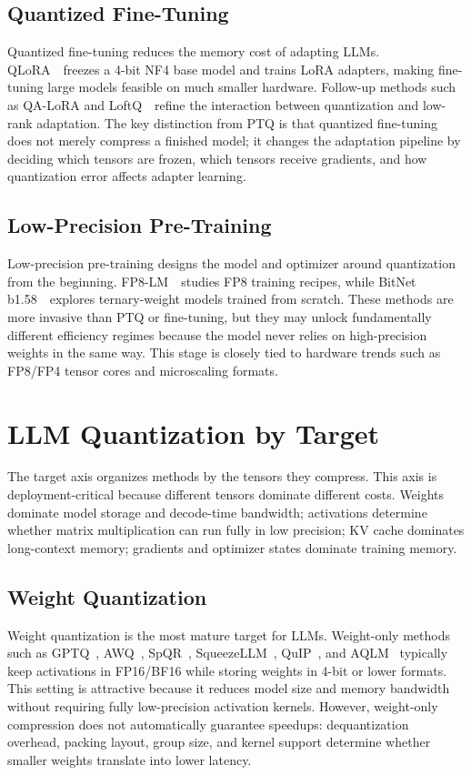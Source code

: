 \documentclass[journal,10pt]{IEEEtran}
\begin{document}
\subsection{Quantized Fine-Tuning}
Quantized fine-tuning reduces the memory cost of adapting LLMs. QLoRA~\cite{dettmers2023qlora}\ freezes a 4-bit NF4 base model and trains LoRA adapters, making fine-tuning large models feasible on much smaller hardware. Follow-up methods such as QA-LoRA and LoftQ~\cite{liu2023qalora,li2023loftq}\ refine the interaction between quantization and low-rank adaptation. The key distinction from PTQ is that quantized fine-tuning does not merely compress a finished model; it changes the adaptation pipeline by deciding which tensors are frozen, which tensors receive gradients, and how quantization error affects adapter learning.

\subsection{Low-Precision Pre-Training}
Low-precision pre-training designs the model and optimizer around quantization from the beginning. FP8-LM~\cite{wu2023fp8lm}\ studies FP8 training recipes, while BitNet b1.58~\cite{ma2024bitnetb158}\ explores ternary-weight models trained from scratch. These methods are more invasive than PTQ or fine-tuning, but they may unlock fundamentally different efficiency regimes because the model never relies on high-precision weights in the same way. This stage is closely tied to hardware trends such as FP8/FP4 tensor cores and microscaling formats.

\section{LLM Quantization by Target}

The target axis organizes methods by the tensors they compress. This axis is deployment-critical because different tensors dominate different costs. Weights dominate model storage and decode-time bandwidth; activations determine whether matrix multiplication can run fully in low precision; KV cache dominates long-context memory; gradients and optimizer states dominate training memory.

\subsection{Weight Quantization}
Weight quantization is the most mature target for LLMs. Weight-only methods such as GPTQ~\cite{frantar2022gptq}, AWQ~\cite{lin2023awq}, SpQR~\cite{dettmers2023spqr}, SqueezeLLM~\cite{kim2023squeezellm}, QuIP~\cite{chee2023quip}, and AQLM~\cite{egiazarian2024aqlm} typically keep activations in FP16/BF16 while storing weights in 4-bit or lower formats. This setting is attractive because it reduces model size and memory bandwidth without requiring fully low-precision activation kernels. However, weight-only compression does not automatically guarantee speedups: dequantization overhead, packing layout, group size, and kernel support determine whether smaller weights translate into lower latency.
\end{document}
